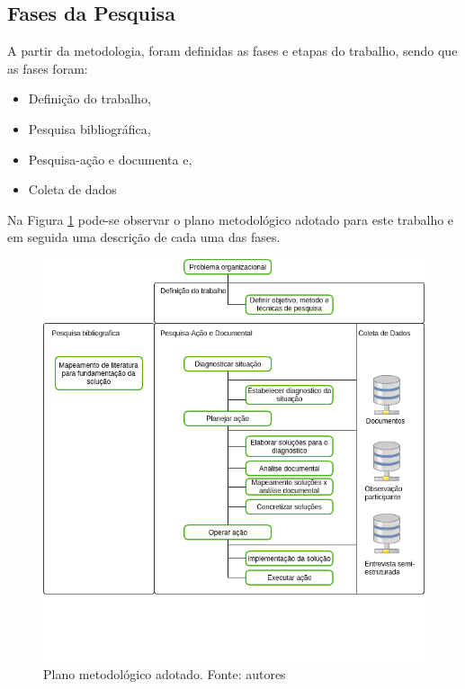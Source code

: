\subsection{Fases da Pesquisa}

A partir da metodologia, foram definidas as fases e etapas do trabalho, sendo que as fases foram:

\begin{itemize}
	\item Definição do trabalho,
	\item Pesquisa bibliográfica,
	\item Pesquisa-ação e documenta e,
	\item Coleta de dados
\end{itemize}

Na Figura \ref{plano_metodologico} pode-se observar o plano metodológico adotado para este trabalho e em seguida
uma descrição de cada uma das fases.

\begin{figure}[!htb]
	\centering
	\includegraphics[scale=0.6]{figuras/Plano_metodologico}
	\caption{Plano metodológico adotado. Fonte: autores}
	\label{plano_metodologico}
\end{figure}

\newpage

